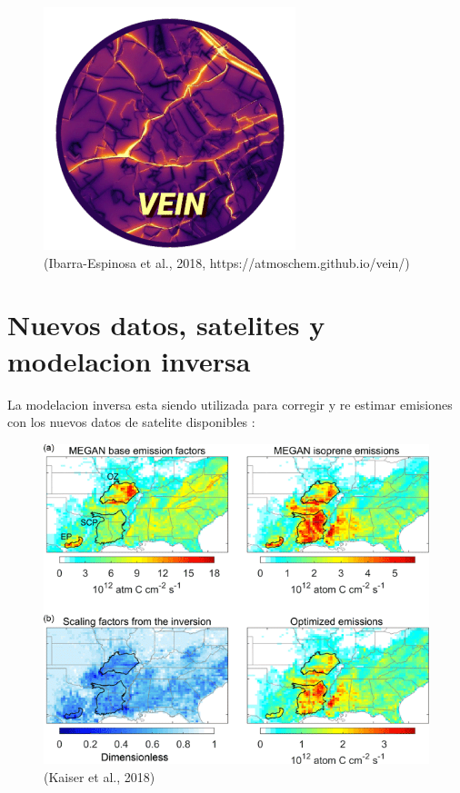 \documentclass[]{book}
\begin{document}
\begin{figure}
\includegraphics[width=1.3\linewidth]{figs/vein2} \caption{(Ibarra-Espinosa et al., 2018, https://atmoschem.github.io/vein/)}\label{fig:unnamed-chunk-29}
\end{figure}

\hypertarget{nuevos-datos-satelites-y-modelacion-inversa}{%
\section{Nuevos datos, satelites y modelacion inversa}\label{nuevos-datos-satelites-y-modelacion-inversa}}

La modelacion inversa esta siendo utilizada para corregir y re estimar emisiones con los nuevos datos de satelite disponibles \citep{acp-18-5483-2018}:

\begin{figure}
\includegraphics[width=1.3\linewidth]{figs/acp} \caption{(Kaiser et al., 2018)}\label{fig:unnamed-chunk-30}
\end{figure}
\end{document}
